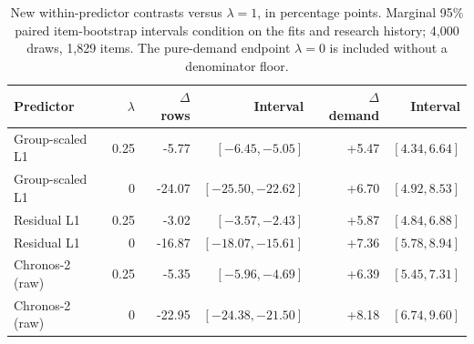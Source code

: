 \begin{table}[htbp]\centering\small
\caption{New within-predictor contrasts versus $\lambda=1$, in percentage points. Marginal 95\% paired item-bootstrap intervals condition on the fits and research history; 4,000 draws, 1,829 items. The pure-demand endpoint $\lambda=0$ is included without a denominator floor.}
\label{tab:accuracy-ci}
\begin{tabular}{lrrrrr}\toprule
Predictor & $\lambda$ & $\Delta$ rows & Interval & $\Delta$ demand & Interval\\\midrule
Group-scaled L1 & 0.25 & -5.77 & $[-6.45,-5.05]$ & +5.47 & $[4.34,6.64]$ \\
Group-scaled L1 & 0 & -24.07 & $[-25.50,-22.62]$ & +6.70 & $[4.92,8.53]$ \\
Residual L1 & 0.25 & -3.02 & $[-3.57,-2.43]$ & +5.87 & $[4.84,6.88]$ \\
Residual L1 & 0 & -16.87 & $[-18.07,-15.61]$ & +7.36 & $[5.78,8.94]$ \\
Chronos-2 (raw) & 0.25 & -5.35 & $[-5.96,-4.69]$ & +6.39 & $[5.45,7.31]$ \\
Chronos-2 (raw) & 0 & -22.95 & $[-24.38,-21.50]$ & +8.18 & $[6.74,9.60]$ \\\bottomrule\end{tabular}\end{table}